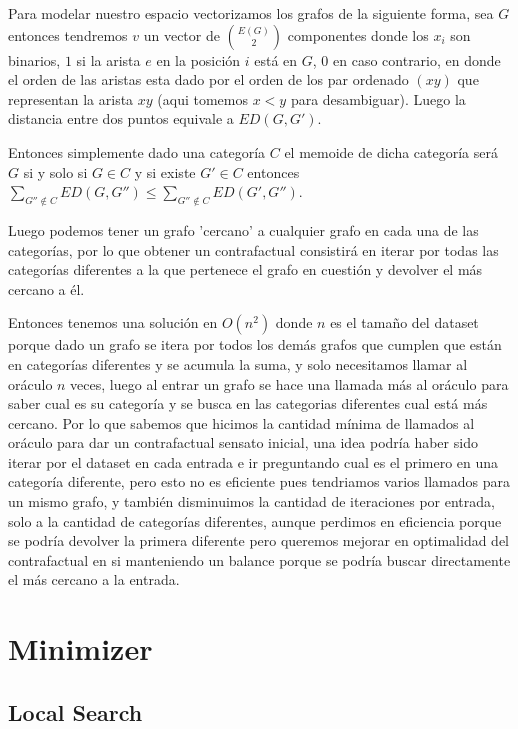 \documentclass[a4paper]{article}
\begin{document}
Para modelar nuestro espacio vectorizamos los grafos de la siguiente forma, sea $G$ entonces tendremos $v$ un vector de $\binom{E(G)}{2}$ componentes donde los $x_i$ son binarios, $1$ si la arista $e$ en la posici\'on $i$ est\'a en $G$, $0$ en caso contrario, en donde el orden de las aristas esta dado por el orden de los par ordenado $(xy)$ que representan la arista $xy$ (aqui tomemos $x<y$ para desambiguar). Luego la distancia entre dos puntos equivale a $ED(G, G')$.

Entonces simplemente dado una categor\'ia $C$ el memoide de dicha categor\'ia ser\'a $G$ si y solo si $G \in C$ y si existe $G' \in C$ entonces $\sum_{G'' \notin C} ED(G, G'') \leq \sum_{G'' \notin C} ED(G', G'')$.

Luego podemos tener un grafo 'cercano' a cualquier grafo en cada una de las categor\'ias, por lo que obtener un contrafactual consistir\'a en iterar por todas las categor\'ias diferentes a la que pertenece el grafo en cuesti\'on y devolver el m\'as cercano a \'el.

Entonces tenemos una soluci\'on en $O(n^2)$ donde $n$ es el tamaño del dataset porque dado un grafo se itera por todos los dem\'as grafos que cumplen que est\'an en categor\'ias diferentes y se acumula la suma, y solo necesitamos llamar al or\'aculo $n$ veces, luego al entrar un grafo se hace una llamada m\'as al or\'aculo para saber cual es su categor\'ia y se busca en las categorias diferentes cual está m\'as cercano. Por lo que sabemos que hicimos la cantidad m\'inima de llamados al or\'aculo para dar un contrafactual sensato inicial, una idea podr\'ia haber sido iterar por el dataset en cada entrada e ir preguntando cual es el primero en una categor\'ia diferente, pero esto no es eficiente pues tendriamos varios llamados para un mismo grafo, y tambi\'en disminuimos la cantidad de iteraciones por entrada, solo a la cantidad de categor\'ias diferentes, aunque perdimos en eficiencia porque se podr\'ia devolver la primera diferente pero queremos mejorar en optimalidad del contrafactual en si manteniendo un balance porque se podr\'ia buscar directamente el m\'as cercano a la entrada.

\section{Minimizer}

\subsection{Local Search}
\end{document}

